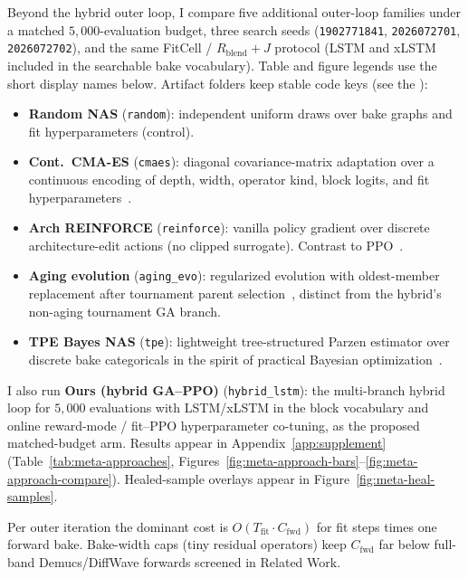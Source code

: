 Beyond the hybrid outer loop, I compare five additional outer-loop families under a matched $5{,}000$-evaluation budget,
three search seeds (\texttt{1902771841}, \texttt{2026072701}, \texttt{2026072702}), and the same FitCell / $R_{\mathrm{blend}}{+}J$ protocol (LSTM and xLSTM included in the searchable bake vocabulary).
Table and figure legends use the short display names below. Artifact folders keep stable code keys (see the ):
\begin{itemize}
  \item \textbf{Random NAS} (\texttt{random}): independent uniform draws over bake graphs and fit hyperparameters (control).
  \item \textbf{Cont.\ CMA-ES} (\texttt{cmaes}): diagonal covariance-matrix adaptation over a continuous encoding of depth, width, operator kind, block logits, and fit hyperparameters~\cite{hansen2016cmaes}.
  \item \textbf{Arch REINFORCE} (\texttt{reinforce}): vanilla policy gradient over discrete architecture-edit actions (no clipped surrogate). Contrast to PPO~\cite{schulman2017,zoph2017nas}.
  \item \textbf{Aging evolution} (\texttt{aging\_evo}): regularized evolution with oldest-member replacement after tournament parent selection~\cite{real2017large,real2019}, distinct from the hybrid's non-aging tournament GA branch.
  \item \textbf{TPE Bayes NAS} (\texttt{tpe}): lightweight tree-structured Parzen estimator over discrete bake categoricals in the spirit of practical Bayesian optimization~\cite{snoek2012}.
\end{itemize}
I also run \textbf{Ours (hybrid GA--PPO)} (\texttt{hybrid\_lstm}): the multi-branch hybrid loop for $5{,}000$ evaluations with LSTM/xLSTM in the block vocabulary and online reward-mode / fit--PPO hyperparameter co-tuning, as the proposed matched-budget arm.
Results appear in Appendix~\ref{app:supplement} (Table~\ref{tab:meta-approaches}, Figures~\ref{fig:meta-approach-bars}--\ref{fig:meta-approach-compare}). Healed-sample overlays appear in Figure~\ref{fig:meta-heal-samples}.

\begin{remark}
\label{rem:complexity}
Per outer iteration the dominant cost is $O(T_{\mathrm{fit}}\cdot C_{\mathrm{fwd}})$ for fit steps times one forward bake.
Bake-width caps (tiny residual operators) keep $C_{\mathrm{fwd}}$ far below full-band Demucs/DiffWave forwards screened in Related Work.
\end{remark}

